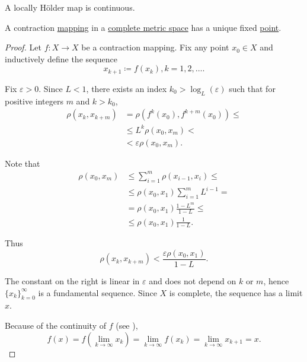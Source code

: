 \begin{corollary}\label{thm:locally_holder_map_is_continuous}
  A locally H\"older map is continuous.
\end{corollary}

\begin{theorem}\label{thm:banach_fixed_point_theorem}
  A contraction \hyperref[def:lipschitz_continuity/contraction]{mapping} in a \hyperref[def:complete_metric_space]{complete metric space} has a unique fixed \hyperref[def:fixed_point]{point}.
\end{theorem}
\begin{proof}
  Let \( f: X \to X \) be a contraction mapping. Fix any point \( x_0 \in X \) and inductively define the sequence
  \begin{equation*}
    x_{k+1} \coloneqq f(x_k), k = 1, 2, \ldots.
  \end{equation*}

  Fix \( \varepsilon > 0 \). Since \( L < 1 \), there exists an index \( k_0 > \log_L(\varepsilon) \) such that for positive integers \( m \) and \( k > k_0 \),
  \begin{align*}
    \rho(x_k, x_{k+m})
     & =
    \rho(f^k(x_0), f^{k+m}(x_0))
    \leq \\ &\leq
    L^k \rho(x_0, x_m)
    <    \\ &<
    \varepsilon \rho(x_0, x_m).
  \end{align*}

  Note that
  \begin{align*}
    \rho(x_0, x_m)
     & \leq
    \sum_{i=1}^m \rho(x_{i-1}, x_i)
    \leq    \\ &\leq
    \rho(x_0, x_1) \sum_{i=1}^m L^{i-1}
    =       \\ &=
    \rho(x_0, x_1) \frac {1 - L^m} {1 - L}
    \leq    \\ &\leq
    \rho(x_0, x_1) \frac 1 {1 - L}.
  \end{align*}

  Thus
  \begin{equation*}
    \rho(x_k, x_{k+m}) < \frac {\varepsilon \rho(x_0, x_1)} {1 - L}.
  \end{equation*}

  The constant on the right is linear in \( \varepsilon \) and does not depend on \( k \) or \( m \), hence \( \{ x_k \}_{k=0}^\infty \) is a fundamental sequence. Since \( X \) is complete, the sequence has a limit \( x \).

  Because of the continuity of \( f \) (see ),
  \begin{equation*}
    f(x) = f(\lim_{k \to \infty} x_k) = \lim_{k \to \infty} f(x_k) = \lim_{k \to \infty} x_{k+1} = x.
  \end{equation*}
\end{proof}
